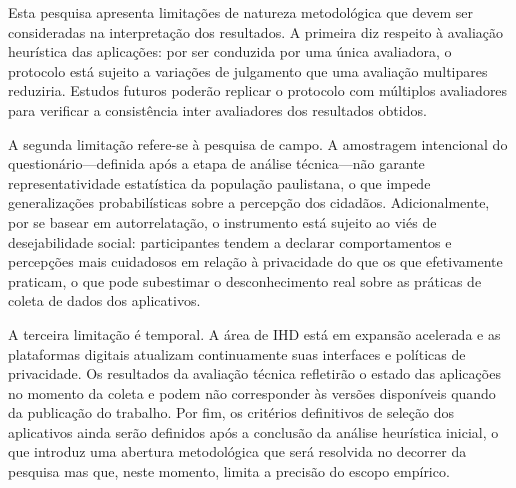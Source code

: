 \documentclass[
	12pt,				%
	oneside,			%
	a4paper,			%
	english,			%
	brazil				%
	]{abntex2ppgsi}
\begin{document}
    Esta pesquisa apresenta limitações de natureza metodológica que devem ser consideradas na interpretação dos resultados. A primeira diz respeito à avaliação heurística das aplicações: por ser conduzida por uma única avaliadora, o protocolo está sujeito a variações de julgamento que uma avaliação multipares reduziria. Estudos futuros poderão replicar o protocolo com múltiplos avaliadores para verificar a consistência inter avaliadores dos resultados obtidos.

    A segunda limitação refere-se à pesquisa de campo. A amostragem intencional do questionário---definida após a etapa de análise técnica---não garante representatividade estatística da população paulistana, o que impede generalizações probabilísticas sobre a percepção dos cidadãos. Adicionalmente, por se basear em autorrelatação, o instrumento está sujeito ao viés de desejabilidade social: participantes tendem a declarar comportamentos e percepções mais cuidadosos em relação à privacidade do que os que efetivamente praticam, o que pode subestimar o desconhecimento real sobre as práticas de coleta de dados dos aplicativos.

    A terceira limitação é temporal. A área de IHD está em expansão acelerada e as plataformas digitais atualizam continuamente suas interfaces e políticas de privacidade. Os resultados da avaliação técnica refletirão o estado das aplicações no momento da coleta e podem não corresponder às versões disponíveis quando da publicação do trabalho. Por fim, os critérios definitivos de seleção dos aplicativos ainda serão definidos após a conclusão da análise heurística inicial, o que introduz uma abertura metodológica que será resolvida no decorrer da pesquisa mas que, neste momento, limita a precisão do escopo empírico.









% 

\end{document}
